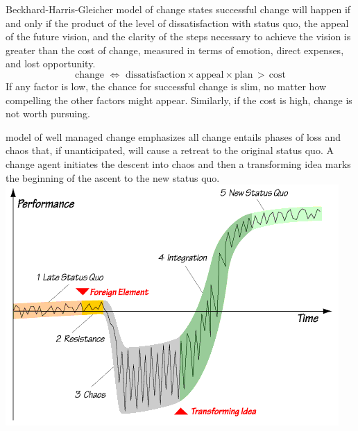 \documentclass{tufte-handout}
\begin{document}
\maketitle

 Beckhard-Harris-Gleicher model of change%
states successful change will happen if and only if the product of the
level of dissatisfaction with status quo, the appeal of the future
vision, and the clarity of the steps necessary to achieve the vision is
greater than the cost of change, measured in terms of emotion, direct
expenses, and lost opportunity.
\begin{displaymath}
  \text{change}
  \,\,\iff\,\,
  \text{dissatisfaction}\times\text{appeal}\times\text{plan}
  \,>\,
  \text{cost}
\end{displaymath}
If any factor is low, the chance for successful change is slim, no matter
how compelling the other factors might appear.
Similarly, if the cost is high, change is not worth pursuing.

 model of well managed change%
emphasizes all change entails phases of loss and chaos that, if
unanticipated, will cause a retreat to the original status quo.
A change agent initiates the descent into chaos and then a transforming
idea marks the beginning of the ascent to the new status quo.\\[5pt]
\includegraphics[scale=0.5]{satir_graph}
\end{document}
